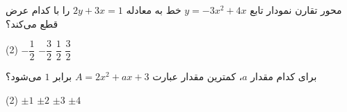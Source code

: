 \begin{example}
    محور تقارن نمودار تابع
    \(y=-3x^2+4x\)
    خط به معادله
    \(2y+3x=1\)
    را با کدام عرض قطع می‌کند؟

    \begin{tasks}(2)
        \task \(-\dfrac{1}{2}\)
        \task \(-\dfrac{3}{2}\)
        \task \(\dfrac{1}{2}\)
        \task \(\dfrac{3}{2}\)
    \end{tasks}
\end{example}


\begin{example}
    برای کدام مقدار \(a\)، کمترین مقدار عبارت
    $A=2x^2+ax+3$
    برابر \(1\) می‌شود؟

    \begin{tasks}(2)
        \task \(\pm 1\)
        \task \(\pm 2\)
        \task \(\pm 3\)
        \task \(\pm 4\)
    \end{tasks}
\end{example}


